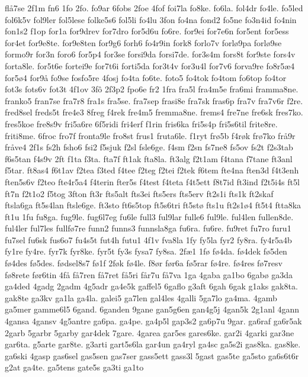 {flå7se
2f1m
fn6
1fo
2fo.
fo9ar
6fobs
2foe
4fof
foi7la
fo8ke.
fo6la.
fol4dr
fo4le.
fo5led
fol6k5v
fol9ler
fol5lese
folke5s6
fol5li
fo4lu
3fon
fo4na
fond2
fo5ne
fo3n4id
fo4nin
fon1s2
f1op
for1a
for9drev
for7dro
for5d6u
fo6re.
for9ei
for7e6n
for5ent
for5ess
for4et
for9e8te.
for9e8ten
for9g6
forh6
fo4r9in
fork8
forlo7v
forlø9pa
forlø9se
formo9r
for3n
foro6
for5p4
for3se
forsi9da
forsi7de.
for3s4m
fors8t
for9ste
fors4v
forta8le.
for5t6e
fortei9e
for7t6i
forti5da
for3t4v
for3u4l
for7v6
forva9re
fo8r5æ4
for5ø4
for9å
fo9se
fosfo5re
4fosj
fo4ta
fo6te.
foto5
fo4tok
fo4tom
fo6top
fo4tor
fot3s
fots6v
fot3t
4f1ov
3fô
2f3p2
fpo6e
fr2
1fra
fra5l
fra4m5e
fra6mi
framma8ne.
franko5
fran7se
fra7r8
fra1s
fra5se.
fra7sep
frasi8e
fra7sk
fras6p
fra7v
fra7v6r
f2re.
fred8sel
freds5t
fre4e3
8freg
f4rek
fre4m5
fremma8ne.
frems4
fre7ne
fre6sk
fres7ko.
fres5koe
fre8s9v
fri5a6re
6f5ridi
fri4erf
f1rin
fris6ka
fri5s4p
fri5s6til
frite8re.
friti8me.
6froc
fro7f
fronta9le
fro8st
frus1
fruta6le.
f1ryt
frø5b
f4røk
frø7ko
frå9r
fråve4
2f1s
fs2h
fsho6
fsi2
f5sjuk
f2sl
fsle6ge.
f4sm
f2sn
fs7ne8
fs5ov
fs2t
f2s3tab
f6s5tan
f4s9v
2ft
f1ta
f3ta.
fta7f
ft1ak
fta8la.
ft3alg
f2t1am
f4tana
f7tane
ft3anl
f5tar.
ft8as4
f6t1av
f2tea
f3ted
f4tee
f2teg
f2tei
f2tek
f6tem
fte4na
ften3d
f4t3enh
ften5s6v
f2teo
fte4r5a4
f4terin
fter5s
f4test
f4teta
f4t5ett
f8t7id
ft3ind
f2t5i4s
ft5l
ft7n
f2t1o2
f5tog
3fton
ft3r
fts5alt
fts3ei
fts5ers
fts5erv
ft2s1i
fts1k
ft2skaf
ftsla6ga
ft5s4lan
ftsle6ge.
ft3sto
ft6s5top
ft5s6tri
ft5stø
fts1u
ft2s1ø4
ft5t4
ftta8ka
ft1u
1fu
fu8ga.
fug9le.
fug6l7eg
fu6le
full3
ful9lar
fulle6
ful9le.
ful4len
fullen8de.
ful4ler
ful7les
fullfø7re
funn2
funns3
funnsla8ga
fu6ra.
fu6re.
fu9ret
fu7ro
furu1
fu7sel
fu6sk
fus6o7
fu4s5t
fut4h
futu1
4f1v
fva8la
1fy
fy5la
fyr2
fy8ra.
fy4r5a4b
fy1re
fy4re.
fyr7k
fyr8ke.
fyr5t
fy3s
fysa7
fy8sa.
2fæ1
1fø
fø4da.
fø4dek
fø5den
fø4des
fø5des.
fødsel8s7
fø1f
2føk
fø4le.
f8ør
før6a
fø5rar
fø4re.
fø4res
fø7resv
fø8rete
før6tin
4få
få7ren
få7ret
få5ri
får7u
få7va
1ga
4gaba
ga1bo
6gabø
ga3da
ga4ded
4gadg
2gadm
4g5adr
ga4e5k
gaffel5
6gaflo
g3aft
6gah
6gak
g1aks
gak8ta.
gak8te
ga3kv
ga1la
ga4la.
galei5
ga7len
gal4les
4galli
5ga7lo
ga4ma.
4gamb
ga5mer
gamme6l5
6gand.
6ganden
9gane
gan5g6en
gan4g5j
4gan5k
2g1anl
4gann
4gansa
4gansv
4g5antre
ga6pa.
ga4pe.
ga4p5l
gap3s2
ga6p7u
9gar.
ga6raf
ga6r5ak
2garb
5garbr
5garby
gar4dek
7gare.
4garea
gar5es
gares6ke.
gar2i
4garki
gar3ne
gar6ta.
g5arte
gar8te.
g3arti
gart5s6la
gar4un
ga4ryl
ga4sc
ga5s2i
gas8ka.
gas8ke.
ga6ski
4gasp
gas6sel
gas5sen
gas7ser
gass5ett
gass3l
5gast
gas5te
ga5sto
ga6s6t6r
g2at
ga4te.
ga5tens
gate5s
ga3ti
ga1to
}
